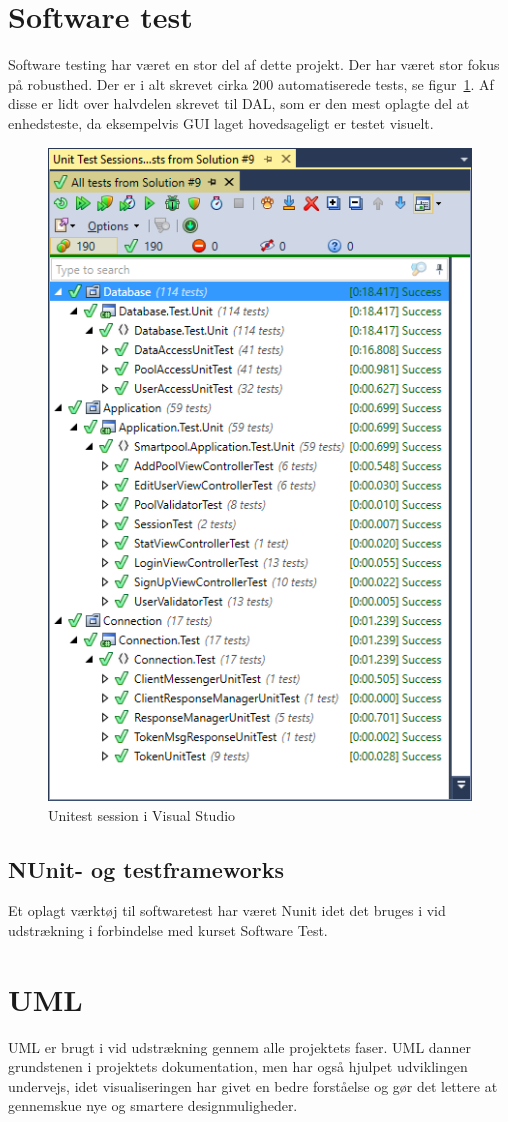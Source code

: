 \section{Software test}
Software testing har været en stor del af dette projekt. Der har været stor fokus på robusthed. Der er i alt skrevet cirka 200 automatiserede tests, se figur~\ref{fig:vsUnittest}. Af disse er lidt over halvdelen skrevet til DAL, som er den mest oplagte del at enhedsteste, da eksempelvis GUI laget hovedsageligt er testet visuelt.

\begin{figure}[h]
	\centering
	\includegraphics[width=0.5\linewidth]{figs/processProjektGennemforsel/vsUnittest}
	\caption{Unitest session i Visual Studio}
	\label{fig:vsUnittest}
\end{figure}

\subsection{NUnit- og testframeworks}
Et oplagt værktøj til softwaretest har været Nunit idet det bruges i vid udstrækning i forbindelse med kurset Software Test.

\section{UML}
UML er brugt i vid udstrækning gennem alle projektets faser. UML danner grundstenen i projektets dokumentation, men har også hjulpet udviklingen undervejs, idet visualiseringen har givet en bedre forståelse og gør det lettere at gennemskue nye og smartere designmuligheder.


